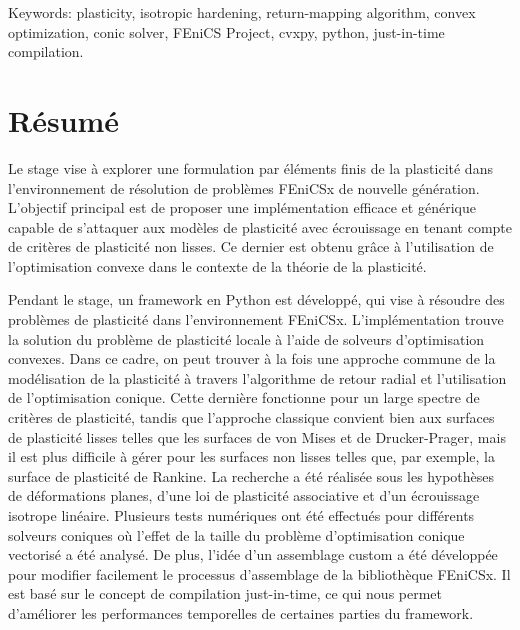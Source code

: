 \documentclass[12pt]{article}
\begin{document}
Keywords: plasticity, isotropic hardening, return-mapping algorithm, convex optimization, conic solver, FEniCS Project, cvxpy, python, just-in-time compilation.

\newpage
\section*{\centering Résumé}

Le stage vise à explorer une formulation par éléments finis de la plasticité dans l'environnement de résolution de problèmes FEniCSx de nouvelle génération. L'objectif principal est de proposer une implémentation efficace et générique capable de s'attaquer aux modèles de plasticité avec écrouissage en tenant compte de critères de plasticité non lisses. Ce dernier est obtenu grâce à l'utilisation de l'optimisation convexe dans le contexte de la théorie de la plasticité.

Pendant le stage, un framework en Python est développé, qui vise à résoudre des problèmes de plasticité dans l'environnement FEniCSx. L'implémentation trouve la solution du problème de plasticité locale à l'aide de solveurs d'optimisation convexes. Dans ce cadre, on peut trouver à la fois une approche commune de la modélisation de la plasticité à travers l'algorithme de retour radial et l'utilisation de l'optimisation conique. Cette dernière fonctionne pour un large spectre de critères de plasticité, tandis que l'approche classique convient bien aux surfaces de plasticité lisses telles que les surfaces de von Mises et de Drucker-Prager, mais il est plus difficile à gérer pour les surfaces non lisses telles que, par exemple, la surface de plasticité de Rankine. La recherche a été réalisée sous les hypothèses de déformations planes, d'une loi de plasticité associative et d'un écrouissage isotrope linéaire. Plusieurs tests numériques ont été effectués pour différents solveurs coniques où l'effet de la taille du problème d'optimisation conique vectorisé a été analysé. De plus, l'idée d'un assemblage custom a été développée pour modifier facilement le processus d'assemblage de la bibliothèque FEniCSx. Il est basé sur le concept de compilation just-in-time, ce qui nous permet d'améliorer les performances temporelles de certaines parties du framework.
\end{document}
